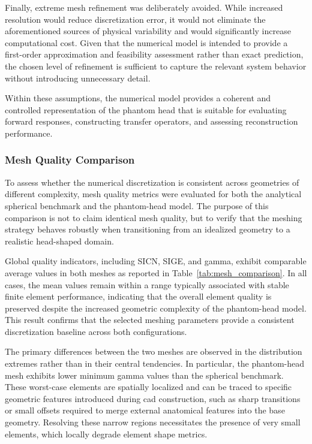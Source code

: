 \documentclass[../00_Main.tex]{subfiles}
\begin{document}
Finally, extreme mesh refinement was deliberately avoided. While increased resolution would reduce discretization error, it would not eliminate the aforementioned sources of physical variability and would significantly increase computational cost. Given that the numerical model is intended to provide a first-order approximation and feasibility assessment rather than exact prediction, the chosen level of refinement is sufficient to capture the relevant system behavior without introducing unnecessary detail.

Within these assumptions, the numerical model provides a coherent and controlled representation of the phantom head that is suitable for evaluating forward responses, constructing transfer operators, and assessing reconstruction performance.

\subsubsection{Mesh Quality Comparison}
To assess whether the numerical discretization is consistent across geometries of different complexity, mesh quality metrics were evaluated for both the analytical spherical benchmark and the phantom-head model. The purpose of this comparison is not to claim identical mesh quality, but to verify that the meshing strategy behaves robustly when transitioning from an idealized geometry to a realistic head-shaped domain.

Global quality indicators, including SICN, SIGE, and gamma, exhibit comparable average values in both meshes as reported in Table~\ref{tab:mesh_comparison}. In all cases, the mean values remain within a range typically associated with stable finite element performance, indicating that the overall element quality is preserved despite the increased geometric complexity of the phantom-head model. This result confirms that the selected meshing parameters provide a consistent discretization baseline across both configurations.

The primary differences between the two meshes are observed in the distribution extremes rather than in their central tendencies. In particular, the phantom-head mesh exhibits lower minimum gamma values than the spherical benchmark. These worst-case elements are spatially localized and can be traced to specific geometric features introduced during \gls{cad} construction, such as sharp transitions or small offsets required to merge external anatomical features into the base geometry. Resolving these narrow regions necessitates the presence of very small elements, which locally degrade element shape metrics.
\end{document}
